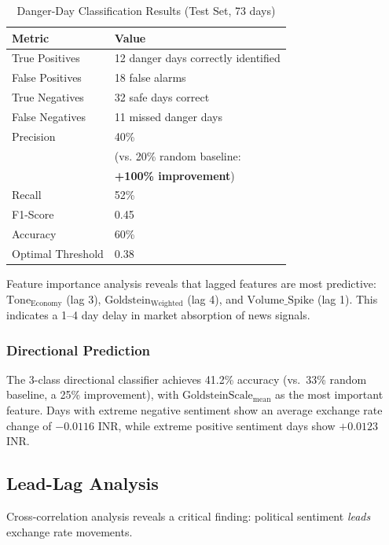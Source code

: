 \documentclass[11pt]{article}
\begin{document}
\begin{table}[H]
\centering
\small
\caption{Danger-Day Classification Results (Test Set, 73 days)}
\label{tab:classification}
\begin{tabular}{ll}
\toprule
\textbf{Metric} & \textbf{Value} \\
\midrule
True Positives & 12 danger days correctly identified \\
False Positives & 18 false alarms \\
True Negatives & 32 safe days correct \\
False Negatives & 11 missed danger days \\
\midrule
Precision & 40\% \\ & (vs. 20\% random baseline: \\ & \textbf{+100\% improvement}) \\
Recall & 52\% \\
F1-Score & 0.45 \\
Accuracy & 60\% \\
Optimal Threshold & 0.38 \\
\bottomrule
\end{tabular}
\end{table}

Feature importance analysis reveals that lagged features are most predictive: $\text{Tone}_\text{Economy}$ (lag 3), $\text{Goldstein}_\text{Weighted}$ (lag 4), and $\text{Volume\_Spike}$ (lag 1). This indicates a 1--4 day delay in market absorption of news signals.

\subsubsection{Directional Prediction}

The 3-class directional classifier achieves 41.2\% accuracy (vs.\ 33\% random baseline, a 25\% improvement), with $\text{GoldsteinScale}_\text{mean}$ as the most important feature. Days with extreme negative sentiment show an average exchange rate change of $-0.0116$ INR, while extreme positive sentiment days show $+0.0123$ INR.

\subsection{Lead-Lag Analysis}

Cross-correlation analysis reveals a critical finding: political sentiment \textit{leads} exchange rate movements.
\end{document}
